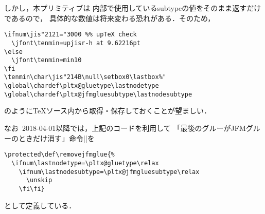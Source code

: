 \documentclass[a4paper,11pt,nomag,dvipdfmx]{jsarticle}
\begin{document}
しかし，本プリミティブは
\epTeX 内部で使用しているsubtypeの値をそのまま返すだけであるので，
具体的な数値は将来変わる恐れがある．そのため，
\begin{verbatim}
\ifnum\jis"2121="3000 %% upTeX check
  \jfont\tenmin=upjisr-h at 9.62216pt
\else
  \jfont\tenmin=min10
\fi
\tenmin\char\jis"214B\null\setbox0\lastbox%"
\global\chardef\pltx@gluetype\lastnodetype
\global\chardef\pltx@jfmgluesubtype\lastnodesubtype
\end{verbatim}
のように\TeX ソース内から取得・保存しておくことが望ましい．

\medskip
なお\pLaTeX~2018-04-01以降では，上記のコードを利用して
「最後のグルーがJFMグルーのときだけ消す」命令|\removejfmglue|を
\begin{verbatim}
\protected\def\removejfmglue{%
  \ifnum\lastnodetype=\pltx@gluetype\relax
    \ifnum\lastnodesubtype=\pltx@jfmgluesubtype\relax
      \unskip
    \fi\fi}
\end{verbatim}
として定義している．
\end{document}

